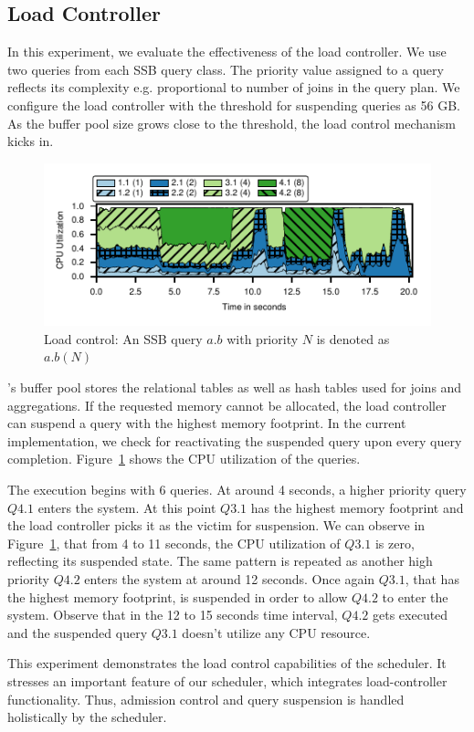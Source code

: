 \subsection{Load Controller}
In this experiment, we evaluate the effectiveness of the load controller.
We use two queries from each SSB query class.
The priority value assigned to a query reflects its complexity e.g. proportional to number of joins in the query plan.
We configure the load controller with the threshold for suspending queries as 56 GB. 
As the buffer pool size grows close to the threshold, the load control mechanism kicks in.

\begin{figure}[]
	\centering
	\includegraphics[width=\columnwidth]{policy/figures/load-control-cpu-util.pdf}
	\caption{Load control: An SSB query $a.b$ with priority $N$ is denoted as $a.b (N)$}
	\label{fig:load-control-cpu-util}
\end{figure}

\sys{}'s buffer pool stores the relational tables as well as hash tables used for joins and aggregations.
If the requested memory cannot be allocated, the load controller can suspend a query with the highest memory footprint. 
In the current implementation, we check for reactivating the suspended query upon every query completion. %
Figure~\ref{fig:load-control-cpu-util} shows the CPU utilization of the queries.

The execution begins with 6 queries.
At around 4 seconds, a higher priority query $Q4.1$ enters the system.
At this point $Q3.1$ has the highest memory footprint and the load controller
picks it as the victim for suspension.
We can observe in Figure~\ref{fig:load-control-cpu-util}, that from 4 to 11 seconds, the CPU utilization of $Q3.1$ is zero, reflecting its suspended state.
The same pattern is repeated as another high priority $Q4.2$ enters the system at around 12 seconds.
Once again $Q3.1$, that has the highest memory footprint, is suspended in order to allow $Q4.2$ to enter the system. 
Observe that in the 12 to 15 seconds time interval, $Q4.2$ gets executed and the suspended query $Q3.1$ doesn't utilize any CPU resource.

This experiment demonstrates the load control capabilities of the \sys{}
scheduler. 
It stresses an important feature of our scheduler, which integrates load-controller functionality. %
Thus, admission control and query suspension is handled holistically by the scheduler. 
